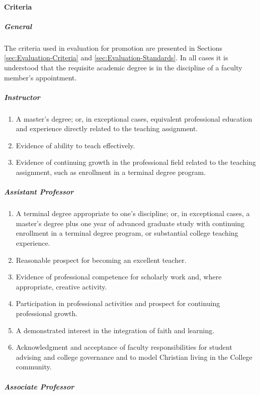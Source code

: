 			\paragraph{Criteria}
				\label{sec:Promotion-Criteria}
				\subparagraph{General}
					The criteria used in evaluation for promotion are presented in Sections
					\ref{sec:Evaluation-Criteria}
					and
					\ref{sec:Evaluation-Standards}. In all cases it is understood that the requisite academic degree is in the discipline of a faculty member's appointment.
				\subparagraph{Instructor}
					\begin{enumerate}[label=\alph*)]
						\item{A master's degree; or, in exceptional cases, equivalent professional education and experience directly related to the teaching assignment.}
						\item{Evidence of ability to teach effectively.}
						\item{Evidence of continuing growth in the professional field related to the teaching assignment, such as enrollment in a terminal degree program.}
					\end{enumerate}
				\subparagraph{Assistant Professor}
					\begin{enumerate}[label=\alph*)]
						\item{A terminal degree appropriate to one's discipline; or, in exceptional cases, a master's degree plus one year of advanced graduate study with continuing enrollment in a terminal degree program, or substantial college teaching experience.}
						\item{Reasonable prospect for becoming an excellent teacher.}
						\item{Evidence of professional competence for scholarly work and, where appropriate, creative activity.}
						\item{Participation in professional activities and prospect for continuing professional growth.}
						\item{A demonstrated interest in the integration of faith and learning.}
						\item{Acknowledgment and acceptance of faculty responsibilities for student advising and college governance and to model Christian living in the College community.}
					\end{enumerate}
				\subparagraph{Associate Professor}
					\label{sec:AssociateProfessor}
